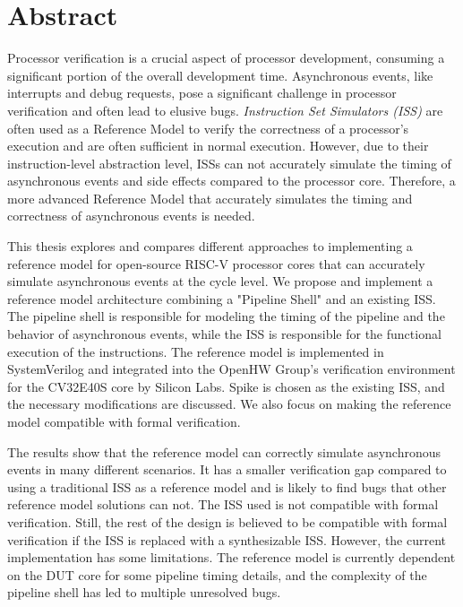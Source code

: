 \chapter*{Abstract}

Processor verification is a crucial aspect of processor development, consuming a significant portion of the overall development time.
Asynchronous events, like interrupts and debug requests, pose a significant challenge in processor verification and often lead to elusive bugs. 
\textit{Instruction Set Simulators (ISS)} are often used as a Reference Model to verify the correctness of a processor's execution and are often sufficient in normal execution. 
However, due to their instruction-level abstraction level, ISSs can not accurately simulate the timing of asynchronous events and side effects compared to the processor core. Therefore, a more advanced Reference Model that accurately simulates the timing and correctness of asynchronous events is needed.


This thesis explores and compares different approaches to implementing a reference model for open-source RISC-V processor cores that can accurately simulate asynchronous events at the cycle level. We propose and implement a reference model architecture combining a "Pipeline Shell" and an existing ISS. The pipeline shell is responsible for modeling the timing of the pipeline and the behavior of asynchronous events, while the ISS is responsible for the functional execution of the instructions. The reference model is implemented in SystemVerilog and integrated into the OpenHW Group's verification environment for the CV32E40S core by Silicon Labs. Spike is chosen as the existing ISS, and the necessary modifications are discussed. We also focus on making the reference model compatible with formal verification.

The results show that the reference model can correctly simulate asynchronous events in many different scenarios. It has a smaller verification gap compared to using a traditional ISS as a reference model and is likely to find bugs that other reference model solutions can not. The ISS used is not compatible with formal verification. Still, the rest of the design is believed to be compatible with formal verification if the ISS is replaced with a synthesizable ISS. However, the current implementation has some limitations. The reference model is currently dependent on the DUT core for some pipeline timing details, and the complexity of the pipeline shell has led to multiple unresolved bugs.







